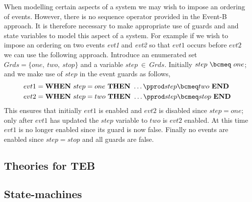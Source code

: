 When modelling certain aspects of a system we may wish to impose an ordering of events. However, there is no sequence operator provided in the Event-B approach. It is therefore necessary to make appropriate use of guards and and state variables to model this aspect of a system. For example if we wish to impose an ordering on two events \emph{evt1} and \emph{evt2} so that $evt1$ occurs before $evt2$ we can use the following approach. Introduce an enumerated set $Grds = \{one,~ two,~ stop\}$ and a variable $step~\in~Grds$. Initially $step~\bcmeq~one$; and we make use of $step$ in the event guards as follows,
\begin{equation}
\begin{split}
&evt1 = \textbf{WHEN}~ step = one~ \textbf{THEN}~\ldots\pprod step \bcmeq two~ \textbf{END}\\
&evt2 = \textbf{WHEN}~ step = two~ \textbf{THEN}~\ldots\pprod step \bcmeq stop~ \textbf{END}\\
\end{split}
\notag
\end{equation}
This ensures that initially $evt1$ is enabled and $evt2$ is disabled since $step = one$; only after $evt1$ has updated the $step$ variable  to $two$ is $evt2$ enabled. At this time $evt1$ is no longer enabled since its guard is now false. Finally no events are enabled since $step = stop$ and all guards are false.



\subsection{Theories for TEB}

\subsection{State-machines}